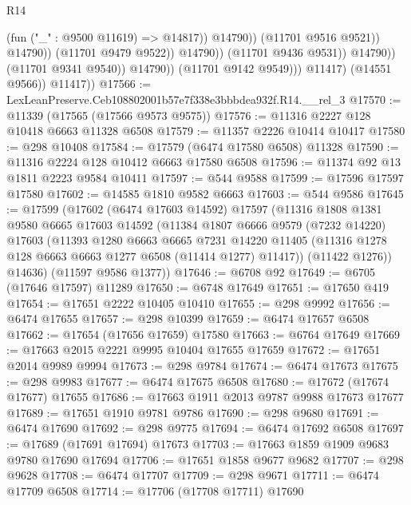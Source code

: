 \begin{lexlean}{R14}
\begin{coremodule}
                                              (fun ("_" : @9500 @11619) => @14817))
                                            @14790))
                                        (@11701 @9516 @9521))
                                      @14790))
                                  (@11701 @9479 @9522))
                                @14790))
                            (@11701 @9436 @9531))
                          @14790))
                      (@11701 @9341 @9540))
                    @14790))
                (@11701 @9142 @9549)))
            @11417)
          (@14551 @9566))
        @11417))
@17566 := LexLeanPreserve.Ceb108802001b57e7f338e3bbbdea932f.R14.__rel_3
@17570 := @11339 (@17565 (@17566 @9573 @9575))
@17576 := @11316 @2227 @128 @10418 @6663 @11328 @6508
@17579 := @11357 @2226 @10414 @10417
@17580 := @298 @10408
@17584 := @17579 (@6474 @17580 @6508) @11328
@17590 := @11316 @2224 @128 @10412 @6663 @17580 @6508
@17596 := @11374 @92 @13 @1811 @2223 @9584 @10411
@17597 := @544 @9588
@17599 := @17596 @17597 @17580
@17602 := @14585 @1810 @9582 @6663
@17603 := @544 @9586
@17645 := @17599
    (@17602
      (@6474 @17603 @14592)
      @17597
      (@11316
        @1808
        @1381
        @9580
        @6665
        @17603
        @14592
        (@11384
          @1807
          @6666
          @9579
          (@7232 @14220)
          @17603
          (@11393
            @1280
            @6663
            @6665
            @7231
            @14220
            @11405
            (@11316 @1278 @128 @6663 @6663 @1277 @6508 (@11414 @1277) @11417))
          (@11422 @1276))
        @14636)
      (@11597 @9586 @1377))
@17646 := @6708 @92
@17649 := @6705 (@17646 @17597) @11289
@17650 := @6748 @17649
@17651 := @17650 @419
@17654 := @17651 @2222 @10405 @10410
@17655 := @298 @9992
@17656 := @6474 @17655
@17657 := @298 @10399
@17659 := @6474 @17657 @6508
@17662 := @17654 (@17656 @17659) @17580
@17663 := @6764 @17649
@17669 := @17663 @2015 @2221 @9995 @10404 @17655 @17659
@17672 := @17651 @2014 @9989 @9994
@17673 := @298 @9784
@17674 := @6474 @17673
@17675 := @298 @9983
@17677 := @6474 @17675 @6508
@17680 := @17672 (@17674 @17677) @17655
@17686 := @17663 @1911 @2013 @9787 @9988 @17673 @17677
@17689 := @17651 @1910 @9781 @9786
@17690 := @298 @9680
@17691 := @6474 @17690
@17692 := @298 @9775
@17694 := @6474 @17692 @6508
@17697 := @17689 (@17691 @17694) @17673
@17703 := @17663 @1859 @1909 @9683 @9780 @17690 @17694
@17706 := @17651 @1858 @9677 @9682
@17707 := @298 @9628
@17708 := @6474 @17707
@17709 := @298 @9671
@17711 := @6474 @17709 @6508
@17714 := @17706 (@17708 @17711) @17690

\end{coremodule}
\end{lexlean}
